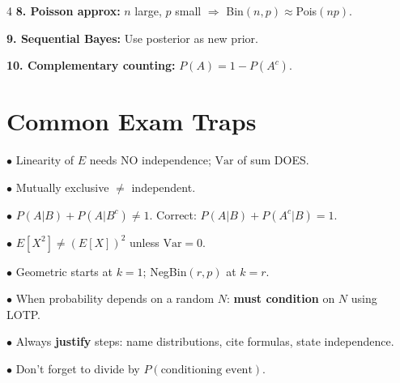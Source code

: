 \documentclass[6pt]{article}
\begin{document}
\begin{multicols}{4}
\textbf{8. Poisson approx:} $n$ large, $p$ small $\Rightarrow$ Bin$(n,p)\approx$Pois$(np)$.

\textbf{9. Sequential Bayes:} Use posterior as new prior.

\textbf{10. Complementary counting:} $P(A)=1-P(A^c)$.

\section{Common Exam Traps}

$\bullet$ Linearity of $E$ needs NO independence; $\text{Var}$ of sum DOES.

$\bullet$ Mutually exclusive $\neq$ independent.

$\bullet$ $P(A|B)+P(A|B^c)\neq 1$. Correct: $P(A|B)+P(A^c|B)=1$.

$\bullet$ $E[X^2]\neq (E[X])^2$ unless $\text{Var}=0$.

$\bullet$ Geometric starts at $k=1$; NegBin$(r,p)$ at $k=r$.

$\bullet$ When probability depends on a random $N$: \textbf{must condition} on $N$ using LOTP.

$\bullet$ Always \textbf{justify} steps: name distributions, cite formulas, state independence.

$\bullet$ Don't forget to divide by $P(\text{conditioning event})$.

\end{multicols}
\end{document}
